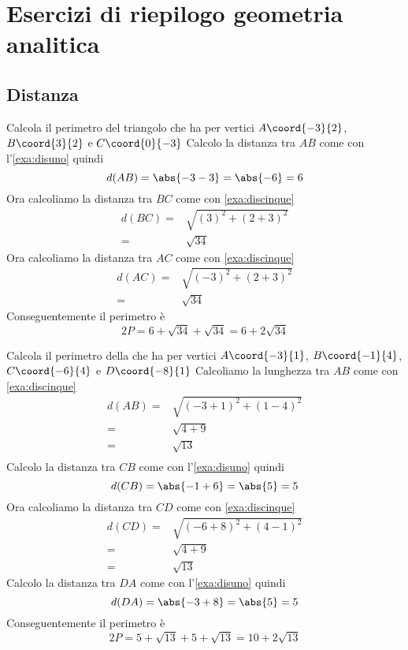 %	
\chapter{Esercizi di riepilogo geometria analitica}
\section{Distanza}
\tcbstartrecording
\begin{exercise}
Calcola il perimetro del triangolo che ha per vertici $A\coord{-3}{2}$, $B\coord{3}{2}$ e $C\coord{0}{-3}$
\tcblower
Calcolo la distanza tra $AB$ come con l'\cref{exa:disuno} 
quindi \[d(AB)=\abs{-3-3}=\abs{-6}=6\] Ora calcoliamo la distanza tra $BC$ come con \cref{exa:discinque} 
\begin{align*}
d(BC)=&\sqrt{(3)^2+(2+3)^2}\\
=&\sqrt{34}
\end{align*}
Ora calcoliamo la distanza tra $AC$ come con \cref{exa:discinque} 
\begin{align*}
d(AC)=&\sqrt{(-3)^2+(2+3)^2}\\
=&\sqrt{34}
\end{align*}
Conseguentemente il perimetro è
\[2P=6+\sqrt{34}+\sqrt{34}=6+2\sqrt{34}\]
\begin{center}
	
	\label{fig:EsRieDistanza11}
\end{center}
\end{exercise}
\begin{exercise}
	Calcola il perimetro della che ha per vertici $A\coord{-3}{1}$, $B\coord{-1}{4}$, $C\coord{-6}{4}$ e  $D\coord{-8}{1}$
	\tcblower
	Calcoliamo la lunghezza tra $AB$ come con \cref{exa:discinque} 
	\begin{align*}
		d(AB)=&\sqrt{(-3+1)^2+(1-4)^2}\\
		=&\sqrt{4+9}\\
		=&\sqrt{13}\\
	\end{align*}
	Calcolo la distanza tra $CB$ come con l'\cref{exa:disuno} 
	quindi \[d(CB)=\abs{-1+6}=\abs{5}=5\]
	Ora calcoliamo la distanza tra $CD$ come con \cref{exa:discinque} 
	\begin{align*}
		d(CD)=&\sqrt{(-6+8)^2+(4-1)^2}\\
			=&\sqrt{4+9}\\
		=&\sqrt{13}
	\end{align*}
	Calcolo la distanza tra $DA$ come con l'\cref{exa:disuno} 
	quindi \[d(DA)=\abs{-3+8}=\abs{5}=5\]
	Conseguentemente il perimetro è
	\[2P=5+\sqrt{13}+5+\sqrt{13}=10+2\sqrt{13}\]
	\begin{center}
		
		\label{fig:EsRieDistanza12}
	\end{center}
\end{exercise}

